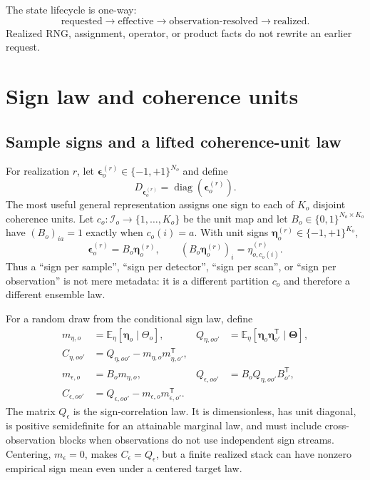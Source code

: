 \documentclass[11pt]{article}
\newcommand{\E}{\mathbb{E}}
\newcommand{\diag}{\operatorname{diag}}
\newcommand{\eps}{\boldsymbol{\epsilon}}
\newcommand{\etaV}{\boldsymbol{\eta}}
\newcommand{\ThetaV}{\boldsymbol{\Theta}}
\begin{document}
The state lifecycle is one-way:
\begin{equation}
  \text{requested}\longrightarrow\text{effective}
  \longrightarrow\text{observation-resolved}
  \longrightarrow\text{realized}.
  \label{eq:state-lifecycle}
\end{equation}
Realized RNG, assignment, operator, or product facts do not rewrite an earlier
request.

\section{Sign law and coherence units}

\subsection{Sample signs and a lifted coherence-unit law}

For realization $r$, let $\eps_o^{(r)}\in\{-1,+1\}^{N_o}$ and define
\begin{equation}
  D_{\eps_o^{(r)}}=\diag\!\left(\eps_o^{(r)}\right).
  \label{eq:sign-operator}
\end{equation}
The most useful general representation assigns one sign to each of $K_o$
disjoint coherence units.  Let
$c_o:\mathcal I_o\rightarrow\{1,\ldots,K_o\}$ be the unit map and let
$B_o\in\{0,1\}^{N_o\times K_o}$ have
$(B_o)_{ia}=1$ exactly when $c_o(i)=a$.  With unit signs
$\etaV_o^{(r)}\in\{-1,+1\}^{K_o}$,
\begin{equation}
  \eps_o^{(r)}=B_o\etaV_o^{(r)},
  \qquad
  (B_o\etaV_o^{(r)})_i=\eta_{o,c_o(i)}^{(r)}.
  \label{eq:coherence-lift}
\end{equation}
Thus a ``sign per sample'', ``sign per detector'', ``sign per scan'', or
``sign per observation'' is not mere metadata: it is a different partition
$c_o$ and therefore a different ensemble law.

For a random draw from the conditional sign law, define
\begin{align}
  m_{\eta,o} &= \E_{\eta}[\etaV_o\mid\Theta_o], &
  Q_{\eta,oo'} &= \E_{\eta}[\etaV_o\etaV_{o'}^{\mathsf T}
      \mid\ThetaV],
  \label{eq:unit-sign-moments}\\
  C_{\eta,oo'} &= Q_{\eta,oo'}-m_{\eta,o}m_{\eta,o'}^{\mathsf T},
  \label{eq:unit-sign-covariance}\\
  m_{\epsilon,o} &= B_o m_{\eta,o}, &
  Q_{\epsilon,oo'} &= B_oQ_{\eta,oo'}B_{o'}^{\mathsf T},
  \label{eq:sample-sign-moments}\\
  C_{\epsilon,oo'} &=Q_{\epsilon,oo'}
    -m_{\epsilon,o}m_{\epsilon,o'}^{\mathsf T}.
  \label{eq:sample-sign-covariance}
\end{align}
The matrix $Q_\epsilon$ is the sign-correlation law.  It is dimensionless,
has unit diagonal, is positive semidefinite for an attainable marginal law,
and must include cross-observation blocks when observations do not use
independent sign streams.  Centering, $m_\epsilon=0$, makes
$C_\epsilon=Q_\epsilon$, but a finite realized stack can have nonzero empirical
sign mean even under a centered target law.
\end{document}
